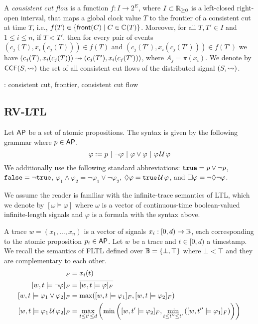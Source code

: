 A \emph{consistent cut flow} is a function $f : I \to 2^E$, where $I \subset \mathbb{R}_{\geq 0}$ is a left-closed right-open interval, that maps a global clock value $T$ to the frontier of a consistent cut at time $T$, i.e., $f(T) \in \{\fr(C) \st C \in \CC(T)\}$.
Moreover, for all $T,T' \in I$ and $1 \leq i \leq n$, if $T < T'$, then for every pair of events $(c_j(T), x_i(c_j(T))) \in f(T)$ and $(c_j(T'), x_i(c_j(T'))) \in f(T')$ we have $(c_j(T), x_i(c_j(T))) \rightsquigarrow (c_j(T'), x_i(c_j(T')))$, where $A_j = \pi(x_i)$.
We denote by $\mathsf{CCF}(S,{\rightsquigarrow})$ the set of all consistent cut flows of the distributed signal $(S,{\rightsquigarrow})$.

\begin{example}
	\TODO: consistent cut, frontier, consistent cut flow
\end{example}

\subsection{RV-LTL} \label{sec:rvltl}

Let $\mathsf{AP}$ be a set of atomic propositions.
The syntax is given by the following grammar where $p \in \mathsf{AP}$.
$$ \varphi :=  p ~|~ \lnot \varphi ~|~ \varphi \lor \varphi ~|~ \varphi \,\mathcal{U}\, \varphi $$
We additionally use the following standard abbreviations: $\texttt{true} = p \lor \lnot p$, $\texttt{false} = \lnot \texttt{true}$, $ \varphi_1 \land \varphi_2 = \lnot \varphi_1 \lor \lnot \varphi_2$, $\lozenge \varphi = \texttt{true} \,\mathcal{U}\, \varphi$, and $\square \varphi = \lnot \lozenge \lnot \varphi$.


We assume the reader is familiar with the infinite-trace semantics of LTL, which we denote by $[\omega \models \varphi]$ where $\omega$ is a vector of continuous-time boolean-valued infinite-length signals and $\varphi$ is a formula with the syntax above.

A trace $w = (x_1, \ldots, x_n)$ is a vector of signals $x_i : [0,d) \to \mathbb{B}$, each corresponding to the atomic proposition $p_i \in \mathsf{AP}$.
Let $w$ be a trace and $t \in [0,d)$ a timestamp.
We recall the semantics of FLTL defined over $\mathbb{B} = \{\bot, \top\}$ where $\bot < \top$ and they are complementary to each other. 
\begin{align*}
	[w,t \models p_i]_F &= x_i(t)\\
	[w,t \models \lnot \varphi]_F &= \overline{[w,t \models \varphi]_F}\\
	[w,t \models \varphi_1 \lor \varphi_2]_F &= \max([w,t \models \varphi_1]_F, [w,t \models \varphi_2]_F)\\
	[w,t \models \varphi_1 \until \varphi_2]_F &= \max_{t \leq t' \leq d} \left( \min \left( [w,t' \models \varphi_2]_F, \min_{t \leq t'' \leq t'} \left( [w,t'' \models \varphi_1]_F \right) \right) \right)\\
\end{align*}

